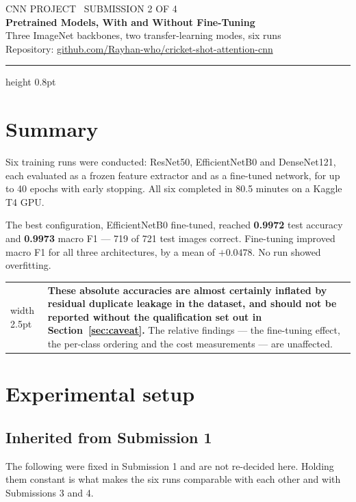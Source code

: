 \documentclass[11pt,a4paper]{article}
\makeatletter
\newenvironment{keybox}
  {\par\medskip\noindent\begin{tabular}{@{}p{0.3em}@{\hspace{0.8em}}p{\dimexpr\linewidth-2.2em}@{}}
   {\color{black}\vrule width 2.5pt} &}
  {\end{tabular}\par\medskip}
\makeatother
\begin{document}
\begin{center}
{\small CNN PROJECT \textbullet\ SUBMISSION 2 OF 4}\\[0.9em]
{\LARGE\bfseries Pretrained Models, With and Without Fine-Tuning}\\[1.0em]
{\large Three ImageNet backbones, two transfer-learning modes, six runs}\\[1.2em]
{\small Repository: \href{https://github.com/Rayhan-who/cricket-shot-attention-cnn}{github.com/Rayhan-who/cricket-shot-attention-cnn}}
\end{center}

\vspace{0.4em}
{\hrule height 0.8pt}
\vspace{1.0em}

\section*{Summary}

Six training runs were conducted: ResNet50, EfficientNetB0 and DenseNet121, each
evaluated as a frozen feature extractor and as a fine-tuned network, for up to 40 epochs
with early stopping. All six completed in 80.5 minutes on a Kaggle T4 GPU.

The best configuration, EfficientNetB0 fine-tuned, reached \textbf{0.9972} test accuracy
and \textbf{0.9973} macro F1 --- 719 of 721 test images correct. Fine-tuning improved
macro F1 for all three architectures, by a mean of $+0.0478$. No run showed
overfitting.

\begin{keybox}
\textbf{These absolute accuracies are almost certainly inflated by residual duplicate
leakage in the dataset, and should not be reported without the qualification set out in
Section~\ref{sec:caveat}.} The relative findings --- the fine-tuning effect, the
per-class ordering and the cost measurements --- are unaffected.
\end{keybox}

\section{Experimental setup}

\subsection{Inherited from Submission 1}

The following were fixed in Submission 1 and are not re-decided here. Holding them
constant is what makes the six runs comparable with each other and with Submissions 3
and 4.
\end{document}
